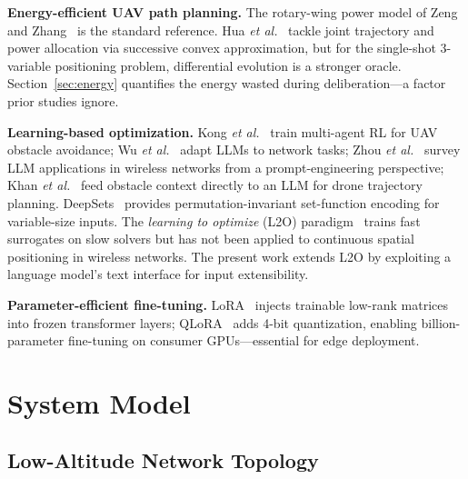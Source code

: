 \documentclass[journal]{IEEEtran}
\begin{document}
\textbf{Energy-efficient UAV path planning.}
The rotary-wing power model of Zeng and Zhang~\cite{zeng2017energy} is the standard reference. Hua \textit{et al.}~\cite{hua2018} tackle joint trajectory and power allocation via successive convex approximation, but for the single-shot 3-variable positioning problem, differential evolution is a stronger oracle. Section~\ref{sec:energy} quantifies the energy wasted during deliberation---a factor prior studies ignore.

\textbf{Learning-based optimization.}
Kong \textit{et al.}~\cite{kong2023multi} train multi-agent RL for UAV obstacle avoidance; Wu \textit{et al.}~\cite{wu2024netllm} adapt LLMs to network tasks; Zhou \textit{et al.}~\cite{zhou2024llm} survey LLM applications in wireless networks from a prompt-engineering perspective; Khan \textit{et al.}~\cite{khan2025llmnav} feed obstacle context directly to an LLM for drone trajectory planning. DeepSets~\cite{zaheer2017deepsets} provides permutation-invariant set-function encoding for variable-size inputs. The \emph{learning to optimize} (L2O) paradigm~\cite{bengio2021} trains fast surrogates on slow solvers but has not been applied to continuous spatial positioning in wireless networks. The present work extends L2O by exploiting a language model's text interface for input extensibility.

\textbf{Parameter-efficient fine-tuning.}
LoRA~\cite{hu2022lora} injects trainable low-rank matrices into frozen transformer layers; QLoRA~\cite{dettmers2023qlora} adds 4-bit quantization, enabling billion-parameter fine-tuning on consumer GPUs---essential for edge deployment.


\section{System Model}
\label{sec:system}

\subsection{Low-Altitude Network Topology}
\end{document}

